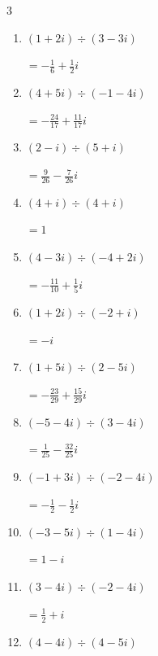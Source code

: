\begin{multicols}{3}
\begin{enumerate}
  \itemsep=30pt
  \item $\displaystyle (1+2i)\div(3-3i)$

        $\displaystyle =-\frac{1}{6}+\frac{1}{2}i$

  \item $\displaystyle (4+5i)\div(-1-4i)$

        $\displaystyle =-\frac{24}{17}+\frac{11}{17}i$

  \item $\displaystyle (2-i)\div(5+i)$

        $\displaystyle =\frac{9}{26}-\frac{7}{26}i$

  \item $\displaystyle (4+i)\div(4+i)$

        $\displaystyle =1$

  \item $\displaystyle (4-3i)\div(-4+2i)$

        $\displaystyle =-\frac{11}{10}+\frac{1}{5}i$

  \item $\displaystyle (1+2i)\div(-2+i)$

        $\displaystyle =-i$

  \item $\displaystyle (1+5i)\div(2-5i)$

        $\displaystyle =-\frac{23}{29}+\frac{15}{29}i$

  \item $\displaystyle (-5-4i)\div(3-4i)$

        $\displaystyle =\frac{1}{25}-\frac{32}{25}i$

  \item $\displaystyle (-1+3i)\div(-2-4i)$

        $\displaystyle =-\frac{1}{2}-\frac{1}{2}i$

  \item $\displaystyle (-3-5i)\div(1-4i)$

        $\displaystyle =1-i$

\columnbreak %

  \item $\displaystyle (3-4i)\div(-2-4i)$

        $\displaystyle =\frac{1}{2}+i$

  \item $\displaystyle (4-4i)\div(4-5i)$


\end{enumerate}
\end{multicols}
